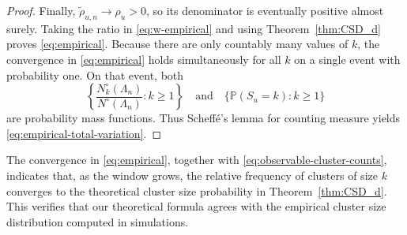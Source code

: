 \documentclass[aap,preprint]{imsart}
\theoremstyle{plain}
\theoremstyle{definition}
\def\P{{\mathbb P}}
\begin{document}
\begin{proof}
		Finally, $\widetilde\rho_{u,n}\to\rho_u>0$, so its denominator is eventually
		positive almost surely. Taking the ratio in \eqref{eq:w-empirical} and using
		Theorem~\ref{thm:CSD_d} proves \eqref{eq:empirical}. Because there are only
		countably many values of $k$, the convergence in \eqref{eq:empirical} holds
		simultaneously for all $k$ on a single event with probability one. On that event,
		both
		\[
		\left\{
		\frac{N_k^\circ(\Lambda_n)}{N^\circ(\Lambda_n)}:k\geq1
		\right\}
		\quad\text{and}\quad
		\{\P(S_u=k):k\geq1\}
		\]
		are probability mass functions. Thus Scheff\'e's
		lemma for counting measure yields
		\eqref{eq:empirical-total-variation}.
	\end{proof}
	
	The convergence in \eqref{eq:empirical}, together with \eqref{eq:observable-cluster-counts}, indicates that, as the window grows, the relative frequency of clusters of size $k$ converges to the theoretical cluster size probability in Theorem~\ref{thm:CSD_d}. This verifies that our theoretical formula agrees with the empirical
	cluster size distribution computed in simulations.
	
\end{document}
